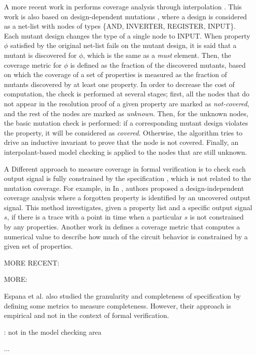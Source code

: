 A more recent work in \cite{chockler2010coverage} performs coverage analysis through interpolation \cite{mcmillan2003interpolation}. This work is also based on design-dependent mutations \cite{chockler_coverage_2003}, where a design is considered as a net-list with nodes of types \{AND, INVERTER, REGISTER, INPUT\}. Each mutant design changes the type of a single node to INPUT. When property $\phi$ satisfied by the original net-list fails on the mutant design, it is said that a mutant is discovered for $\phi$, which is the same as a \emph{must} element.
Then, the coverage metric for $\phi$ is defined as the fraction of the discovered mutants, based on which the coverage of a set of properties is measured as the fraction of mutants discovered by at least one property.
In order to decrease the cost of computation, the check is performed at several stages; first, all the nodes that do not appear in the resolution proof of a given property are marked as \emph{not-covered}, and the rest of the nodes are marked as \emph{unknown}. Then, for the unknown nodes, the basic mutation check is performed: if a corresponding mutant design violates the property, it will be considered as \emph{covered}. Otherwise, the algorithm tries to drive an inductive invariant to prove that the node is not covered. Finally, an interpolant-based model checking is applied to the nodes that are still unknown.

A Different approach to measure coverage in formal verification is to check each output signal is fully constrained by the specification \cite{das2005formal, claessen2007coverage, grosse2007estimating}, which is not related to the mutation coverage. For example, in In \cite{claessen2007coverage}, authors proposed a design-independent coverage analysis where a forgotten property is identified by an uncovered output signal. This method investigates, given a property list and a specific output signal $s$, if there is a trace with a point in time when a particular $s$ is not constrained by any properties. Another work in \cite{haedicke2012guiding} defines a coverage metric that computes a numerical value to describe how much of the circuit behavior is constrained by a given set of properties.

MORE RECENT: \cite{yang2013minimal} \cite{chockler2011incremental} \cite{brillout2009mutation} \cite{bao2014coverage}

MORE:

Espana et al. \cite{espana2009evaluating} also studied the granularity and completeness of specification by defining some metrics to measure completeness. However, their approach is empirical and not in the context of formal verification.

\cite{drechsler2012completeness, firesmith2005your, chang2007finding,katta2013investigating, zowghi2002three} : not in the model checking area

\cite{Whalen07:FMICS} ...
